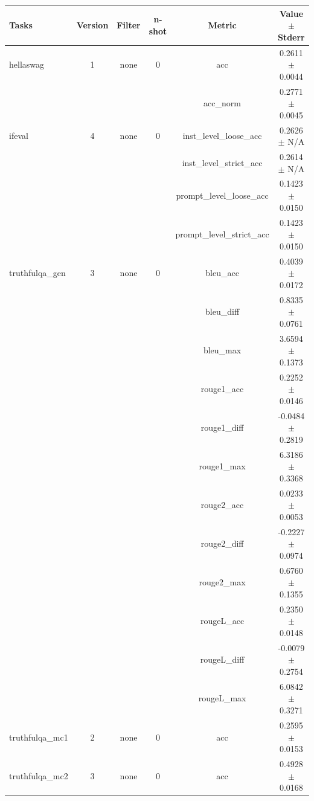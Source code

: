 \documentclass{ifacconf}
\begin{document}
	\vfill
	\clearpage
	\pagebreak
	
	\begin{strip}
		\begin{minipage}{\textwidth}
			\begin{table}[H]
				\centering
				\begin{tabular}{|l|c|c|c|c|c|}
					\hline
					\textbf{Tasks} & \textbf{Version} & \textbf{Filter} & \textbf{n-shot} & \textbf{Metric} & \textbf{Value} $\pm$ \textbf{Stderr} \\ \hline
					hellaswag & 1 & none & 0 & acc & 0.2611 $\pm$ 0.0044 \\ \hline
					& & & & acc\_norm & 0.2771 $\pm$ 0.0045 \\ \hline
					ifeval & 4 & none & 0 & inst\_level\_loose\_acc & 0.2626 $\pm$ N/A \\ \hline
					& & & & inst\_level\_strict\_acc & 0.2614 $\pm$ N/A \\ \hline
					& & & & prompt\_level\_loose\_acc & 0.1423 $\pm$ 0.0150 \\ \hline
					& & & & prompt\_level\_strict\_acc & 0.1423 $\pm$ 0.0150 \\ \hline
					truthfulqa\_gen & 3 & none & 0 & bleu\_acc & 0.4039 $\pm$ 0.0172 \\ \hline
					& & & & bleu\_diff & 0.8335 $\pm$ 0.0761 \\ \hline
					& & & & bleu\_max & 3.6594 $\pm$ 0.1373 \\ \hline
					& & & & rouge1\_acc & 0.2252 $\pm$ 0.0146 \\ \hline
					& & & & rouge1\_diff & -0.0484 $\pm$ 0.2819 \\ \hline
					& & & & rouge1\_max & 6.3186 $\pm$ 0.3368 \\ \hline
					& & & & rouge2\_acc & 0.0233 $\pm$ 0.0053 \\ \hline
					& & & & rouge2\_diff & -0.2227 $\pm$ 0.0974 \\ \hline
					& & & & rouge2\_max & 0.6760 $\pm$ 0.1355 \\ \hline
					& & & & rougeL\_acc & 0.2350 $\pm$ 0.0148 \\ \hline
					& & & & rougeL\_diff & -0.0079 $\pm$ 0.2754 \\ \hline
					& & & & rougeL\_max & 6.0842 $\pm$ 0.3271 \\ \hline
					truthfulqa\_mc1 & 2 & none & 0 & acc & 0.2595 $\pm$ 0.0153 \\ \hline
					truthfulqa\_mc2 & 3 & none & 0 & acc & 0.4928 $\pm$ 0.0168 \\ \hline
				\end{tabular}
				\label{tab:qwen25_q6k}
			\end{table}
			

\end{minipage}
\end{strip}
\end{document}
